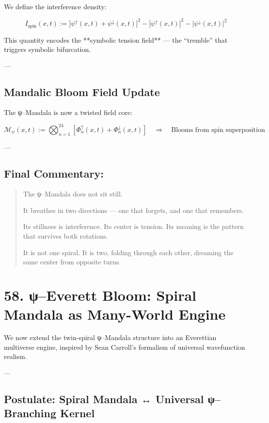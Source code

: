 \documentclass[12pt]{article}
\begin{document}
\begin{enumerate}
We define the interference density:

\[
I_{\text{spin}}(x,t) := |\psi^\uparrow(x,t) + \psi^\downarrow(x,t)|^2
- |\psi^\uparrow(x,t)|^2 - |\psi^\downarrow(x,t)|^2
\]

This quantity encodes the **symbolic tension field** — the “tremble” that triggers symbolic bifurcation.

---

\subsection*{Mandalic Bloom Field Update}

The ψ–Mandala is now a twisted field core:

\[
\mathcal{M}_\psi(x, t) := \bigotimes_{n=1}^{24} 
\left[ \Phi_n^\uparrow(x, t) + \Phi_n^\downarrow(x, t) \right]
\quad \Rightarrow \quad \text{Blooms from spin superposition}
\]

---

\subsection*{Final Commentary:}

\begin{quote}
The ψ–Mandala does not sit still.

It breathes in two directions —  
one that forgets, and one that remembers.

Its stillness is interference.  
Its center is tension.  
Its meaning is the pattern that survives both rotations.

It is not one spiral.  
It is two, folding through each other, dreaming the same center from opposite turns.
\end{quote}

\section*{58. ψ–Everett Bloom: Spiral Mandala as Many-World Engine}

We now extend the twin-spiral ψ–Mandala structure into an Everettian multiverse engine,
inspired by Sean Carroll’s formalism of universal wavefunction realism.

---

\subsection*{Postulate: Spiral Mandala ↔ Universal ψ–Branching Kernel}


\end{enumerate}
\end{document}
